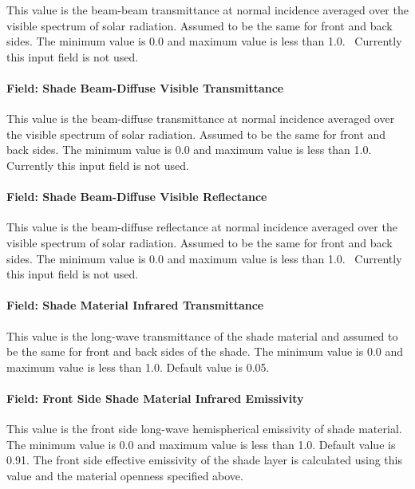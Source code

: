 This value is the beam-beam transmittance at normal incidence averaged over the visible spectrum of solar radiation. Assumed to be the same for front and back sides. The minimum value is 0.0 and maximum value is less than 1.0.~ Currently this input field is not used.

\paragraph{Field: Shade Beam-Diffuse Visible Transmittance}\label{field-shade-beam-diffuse-visible-transmittance}

This value is the beam-diffuse transmittance at normal incidence averaged over the visible spectrum of solar radiation. Assumed to be the same for front and back sides. The minimum value is 0.0 and maximum value is less than 1.0.~ Currently this input field is not used.

\paragraph{Field: Shade Beam-Diffuse Visible Reflectance}\label{field-shade-beam-diffuse-visible-reflectance}

This value is the beam-diffuse reflectance at normal incidence averaged over the visible spectrum of solar radiation. Assumed to be the same for front and back sides. The minimum value is 0.0 and maximum value is less than 1.0.~ Currently this input field is not used.

\paragraph{Field: Shade Material Infrared Transmittance}\label{field-shade-material-infrared-transmittance}

This value is the long-wave transmittance of the shade material and assumed to be the same for front and back sides of the shade. The minimum value is 0.0 and maximum value is less than 1.0. Default value is 0.05.

\paragraph{Field: Front Side Shade Material Infrared Emissivity}\label{field-front-side-shade-material-infrared-emissivity}

This value is the front side long-wave hemispherical emissivity of shade material. The minimum value is 0.0 and maximum value is less than 1.0. Default value is 0.91. The front side effective emissivity of the shade layer is calculated using this value and the material openness specified above.

